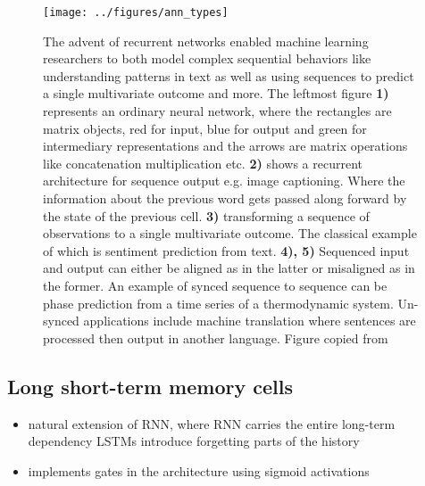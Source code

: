 \begin{figure}
\centering
\texttt{[image: ../figures/ann\_types]}
\caption[Archetypes of recurrent neural architectures]{The advent of recurrent networks enabled machine learning researchers to both model complex sequential behaviors like understanding patterns in text as well as using sequences to predict a single multivariate outcome and more. The leftmost figure \textbf{1)} represents an ordinary neural network, where the rectangles are matrix objects, red for input, blue for output and green for intermediary representations and the arrows are matrix operations like concatenation multiplication etc. \textbf{2)} shows a recurrent architecture for sequence output e.g. image captioning. Where the information about the previous word gets passed along forward by the state of the previous cell. \textbf{3)} transforming a sequence of observations to a single multivariate outcome. The classical example of which is sentiment prediction from text. \textbf{4), 5)} Sequenced input and output can either be aligned as in the latter or misaligned as in the former. An example of synced sequence to sequence can be phase prediction from a time series of a thermodynamic system. Un-synced applications include machine translation where sentences are processed then output in another language. Figure copied from \cite{Karpathy2015}}\label{fig:ann_architectures}
\end{figure}

\subsection{Long short-term memory cells}\label{sec:lstm}

\begin{itemize}
\item natural extension of RNN, where RNN carries the entire long-term dependency LSTMs introduce forgetting parts of the history
\item implements gates in the architecture using sigmoid activations 
\end{itemize}